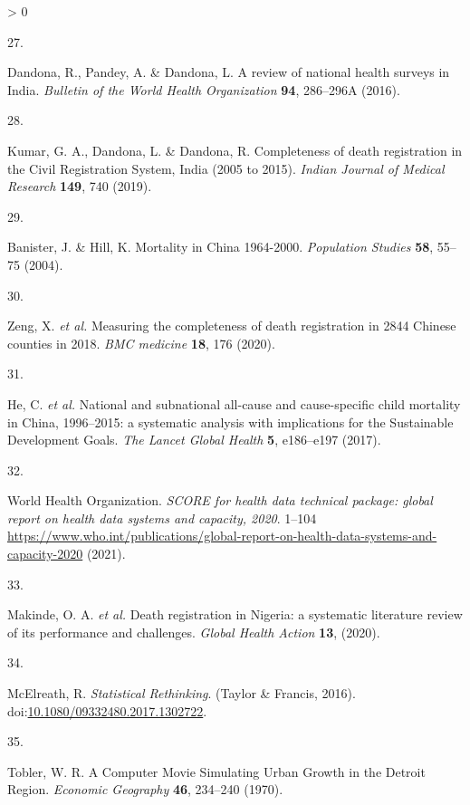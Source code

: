\documentclass[
]{article}
\newlength{\cslhangindent}
\newlength{\csllabelwidth}
\newenvironment{CSLReferences}[2] %
 {%
  \setlength{\parindent}{0pt}
  \ifodd #1 \everypar{\setlength{\hangindent}{\cslhangindent}}\ignorespaces\fi
  \ifnum #2 > 0
  \setlength{\parskip}{#2\baselineskip}
  \fi
 }%
 {}
\newcommand{\CSLLeftMargin}[1]{\parbox[t]{\csllabelwidth}{#1}}
\newcommand{\CSLRightInline}[1]{\parbox[t]{\linewidth - \csllabelwidth}{#1}\break}
\begin{document}
\begin{CSLReferences}{0}{0}
\leavevmode\hypertarget{ref-Dandona2016}{}%
\CSLLeftMargin{27. }
\CSLRightInline{Dandona, R., Pandey, A. \& Dandona, L. {A review of national health surveys in India}. \emph{Bulletin of the World Health Organization} \textbf{94}, 286--296A (2016).}

\leavevmode\hypertarget{ref-Kumar2019}{}%
\CSLLeftMargin{28. }
\CSLRightInline{Kumar, G. A., Dandona, L. \& Dandona, R. {Completeness of death registration in the Civil Registration System, India (2005 to 2015)}. \emph{Indian Journal of Medical Research} \textbf{149}, 740 (2019).}

\leavevmode\hypertarget{ref-Banister2004}{}%
\CSLLeftMargin{29. }
\CSLRightInline{Banister, J. \& Hill, K. {Mortality in China 1964-2000}. \emph{Population Studies} \textbf{58}, 55--75 (2004).}

\leavevmode\hypertarget{ref-Zeng2020}{}%
\CSLLeftMargin{30. }
\CSLRightInline{Zeng, X. \emph{et al.} {Measuring the completeness of death registration in 2844 Chinese counties in 2018}. \emph{BMC medicine} \textbf{18}, 176 (2020).}

\leavevmode\hypertarget{ref-He2017}{}%
\CSLLeftMargin{31. }
\CSLRightInline{He, C. \emph{et al.} {National and subnational all-cause and cause-specific child mortality in China, 1996--2015: a systematic analysis with implications for the Sustainable Development Goals}. \emph{The Lancet Global Health} \textbf{5}, e186--e197 (2017).}

\leavevmode\hypertarget{ref-WorldHealthOrganization2021}{}%
\CSLLeftMargin{32. }
\CSLRightInline{World Health Organization. \emph{{SCORE for health data technical package: global report on health data systems and capacity, 2020}}. 1--104 \url{https://www.who.int/publications/global-report-on-health-data-systems-and-capacity-2020} (2021).}

\leavevmode\hypertarget{ref-Makinde2020}{}%
\CSLLeftMargin{33. }
\CSLRightInline{Makinde, O. A. \emph{et al.} {Death registration in Nigeria: a systematic literature review of its performance and challenges}. \emph{Global Health Action} \textbf{13}, (2020).}

\leavevmode\hypertarget{ref-McElreath2016}{}%
\CSLLeftMargin{34. }
\CSLRightInline{McElreath, R. \emph{{Statistical Rethinking}}. (Taylor \& Francis, 2016). doi:\href{https://doi.org/10.1080/09332480.2017.1302722}{10.1080/09332480.2017.1302722}.}

\leavevmode\hypertarget{ref-Tobler1970}{}%
\CSLLeftMargin{35. }
\CSLRightInline{Tobler, W. R. {A Computer Movie Simulating Urban Growth in the Detroit Region}. \emph{Economic Geography} \textbf{46}, 234--240 (1970).}


\end{CSLReferences}
\end{document}
